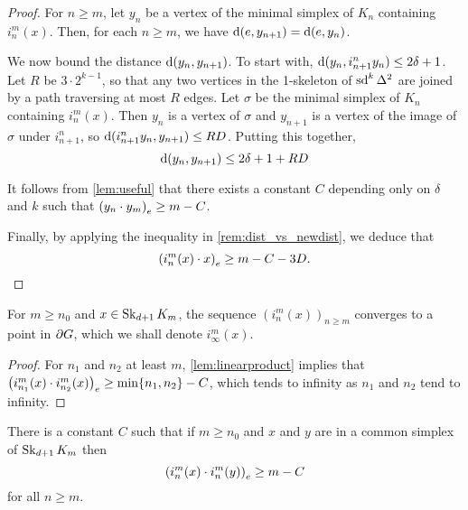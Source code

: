 \documentclass[a4paper]{article}
\begin{document}
\begin{proof}
  For $n \geq m$, let $y_n$ be a vertex of the minimal simplex of $K_n$
  containing $i^m_n(x)$. Then, for each $n \geq m$, we have $\dist(e, y_{n+1})
  = \dist(e, y_n)$. 

  We now bound the distance $\dist(y_n, y_{n+1})$. To start with, $\dist(y_n,
  i^n_{n+1} y_n) \leq 2\delta+1$. Let $R$ be $3\cdot 2^{k-1}$, so that any two
  vertices in the 1-skeleton of $\sd^k \Delta^2$ are joined by a path
  traversing at most $R$ edges. Let $\sigma$ be the minimal simplex of $K_n$
  containing $i^m_n(x)$. Then $y_n$ is a vertex of $\sigma$ and $y_{n+1}$ is a
  vertex of the image of $\sigma$ under $i^n_{n+1}$, so $\dist(i^n_{n+1} y_n,
  y_{n+1}) \leq RD$.  Putting this together,
  \begin{equation*}
      \dist(y_n, y_{n+1}) \leq 2\delta + 1 + RD
  \end{equation*}

  It follows from \cref{lem:useful} that there exists a constant $C$ depending
  only on $\delta$ and $k$ such that $\gromov{e}{y_n}{y_m} \geq m -
  C$.

  Finally, by applying the inequality in \cref{rem:dist_vs_newdist}, we deduce
  that
  \begin{equation*}
      \gromov{e}{i^m_n(x)}{x} \geq m - C - 3D.\qedhere
  \end{equation*}
\end{proof}

\begin{corollary}
  For $m \geq n_0$ and $x \in \Skel_{d+1} K_m$, the sequence
  $(i^m_n(x))_{n\geq m}$ converges to a point in $\boundary G$, which we shall
  denote $i^m_\infty(x)$.
\end{corollary}

\begin{proof}
  For $n_1$ and $n_2$ at least $m$, \cref{lem:linearproduct} implies that
  $\gromov{e}{i^m_{n_1}(x)}{i^m_{n_2}(x)} \geq \min\{n_1,n_2\} - C$, which
  tends to infinity as $n_1$ and $n_2$ tend to infinity.
\end{proof}

\begin{lemma}\label{lem:simplexproduct}
  There is a constant $C$ such that if $m \geq n_0$ and $x$ and $y$ are in a
  common simplex of $\Skel_{d+1} K_m$ then
  \begin{equation*}
    \gromov{e}{i^m_n(x)}{i^m_n(y)} \geq m - C
  \end{equation*}
  for all $n\geq m$.
\end{lemma}
\end{document}
